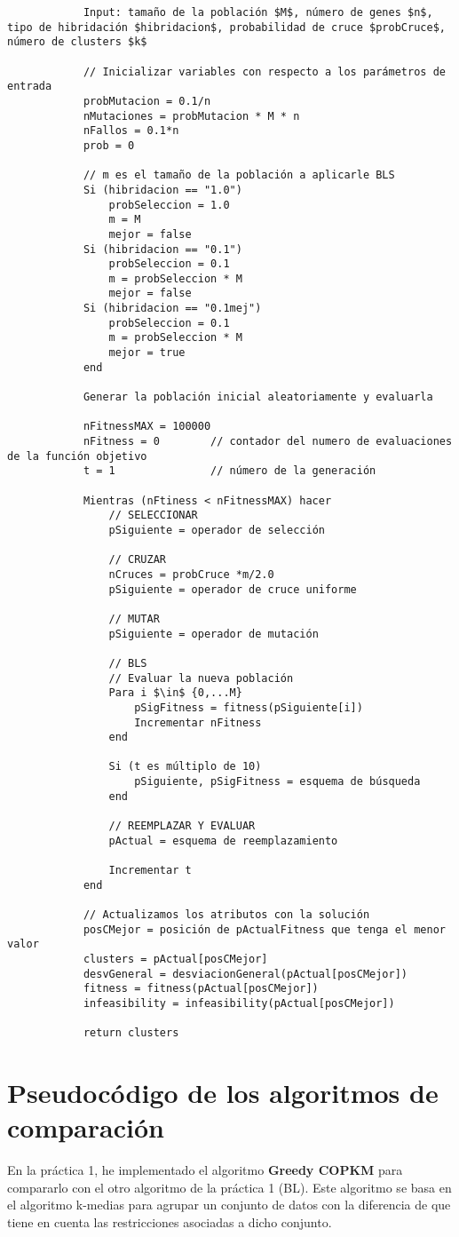 		\footnotesize 
		\begin{lstlisting}
			Input: tamaño de la población $M$, número de genes $n$, tipo de hibridación $hibridacion$, probabilidad de cruce $probCruce$, número de clusters $k$

			// Inicializar variables con respecto a los parámetros de entrada
			probMutacion = 0.1/n
			nMutaciones = probMutacion * M * n
			nFallos = 0.1*n
			prob = 0

			// m es el tamaño de la población a aplicarle BLS
			Si (hibridacion == "1.0")
				probSeleccion = 1.0
				m = M		
				mejor = false		
			Si (hibridacion == "0.1")
				probSeleccion = 0.1
				m = probSeleccion * M
				mejor = false
			Si (hibridacion == "0.1mej")
				probSeleccion = 0.1
				m = probSeleccion * M
				mejor = true
			end 

			Generar la población inicial aleatoriamente y evaluarla

			nFitnessMAX = 100000
			nFitness = 0		// contador del numero de evaluaciones de la función objetivo 
			t = 1				// número de la generación
			
			Mientras (nFtiness < nFitnessMAX) hacer 
				// SELECCIONAR
				pSiguiente = operador de selección

				// CRUZAR 
				nCruces = probCruce *m/2.0
				pSiguiente = operador de cruce uniforme

				// MUTAR 
				pSiguiente = operador de mutación

				// BLS
				// Evaluar la nueva población
				Para i $\in$ {0,...M}
					pSigFitness = fitness(pSiguiente[i])
					Incrementar nFitness
				end 

				Si (t es múltiplo de 10)
					pSiguiente, pSigFitness = esquema de búsqueda
				end

				// REEMPLAZAR Y EVALUAR
				pActual = esquema de reemplazamiento

				Incrementar t
			end

			// Actualizamos los atributos con la solución
			posCMejor = posición de pActualFitness que tenga el menor valor
			clusters = pActual[posCMejor]
			desvGeneral = desviacionGeneral(pActual[posCMejor])
			fitness = fitness(pActual[posCMejor])
			infeasibility = infeasibility(pActual[posCMejor])

			return clusters
		\end{lstlisting}
		\normalsize
\newpage

\section{Pseudocódigo de los algoritmos de comparación}
		En la práctica 1, he implementado el algoritmo \textbf{Greedy COPKM} para compararlo con el otro algoritmo de la práctica 1 (BL).
		Este algoritmo se basa en el algoritmo k-medias para agrupar un conjunto de datos con la diferencia de que tiene en cuenta 
		las restricciones asociadas a dicho conjunto.

